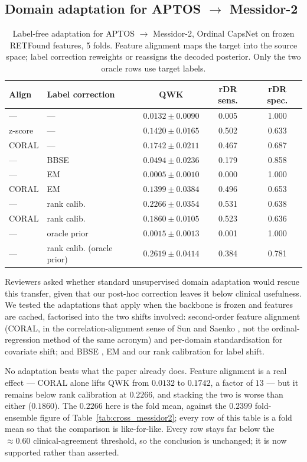 \documentclass[journal]{IEEEtran}
\begin{document}
\subsection{Domain adaptation for APTOS $\to$ Messidor-2}
\label{sec:uda}
\begin{table}[!t]
\centering
\caption{Label-free adaptation for APTOS $\to$ Messidor-2, Ordinal CapsNet on frozen RETFound features, 5 folds. Feature alignment maps the target into the source space; label correction reweights or reassigns the decoded posterior. Only the two oracle rows use target labels.}
\label{tab:uda}
\begin{tabular}{llccc}
\toprule
Align & Label correction & QWK & rDR sens. & rDR spec. \\
\midrule
--- & --- & $0.0132 \pm 0.0090$ & 0.005 & 1.000 \\
z-score & --- & $0.1420 \pm 0.0165$ & 0.502 & 0.633 \\
CORAL & --- & $0.1742 \pm 0.0211$ & 0.467 & 0.687 \\
--- & BBSE & $0.0494 \pm 0.0236$ & 0.179 & 0.858 \\
--- & EM & $0.0005 \pm 0.0010$ & 0.000 & 1.000 \\
CORAL & EM & $0.1399 \pm 0.0384$ & 0.496 & 0.653 \\
--- & rank calib. & $0.2266 \pm 0.0354$ & 0.531 & 0.638 \\
CORAL & rank calib. & $0.1860 \pm 0.0105$ & 0.523 & 0.636 \\
--- & oracle prior & $0.0015 \pm 0.0013$ & 0.001 & 1.000 \\
--- & rank calib. (oracle prior) & $0.2619 \pm 0.0414$ & 0.384 & 0.781 \\
\bottomrule
\end{tabular}
\end{table}

Reviewers asked whether standard unsupervised domain adaptation would rescue this transfer, given that our post-hoc correction leaves it below clinical usefulness. We tested the adaptations that apply when the backbone is frozen and features are cached, factorised into the two shifts involved: second-order feature alignment (CORAL, in the correlation-alignment sense of Sun and Saenko \cite{ref:coral_da}, not the ordinal-regression method of the same acronym) and per-domain standardisation for covariate shift; and BBSE \cite{ref:bbse}, EM \cite{ref:saerens} and our rank calibration for label shift.

No adaptation beats what the paper already does. Feature alignment is a real effect --- CORAL alone lifts QWK from $0.0132$ to $0.1742$, a factor of $13$ --- but it remains below rank calibration at $0.2266$, and stacking the two is worse than either ($0.1860$). The $0.2266$ here is the fold mean, against the $0.2399$ fold-ensemble figure of Table~\ref{tab:cross_messidor2}; every row of this table is a fold mean so that the comparison is like-for-like. Every row stays far below the $\approx 0.60$ clinical-agreement threshold, so the conclusion is unchanged; it is now supported rather than asserted.
\end{document}
